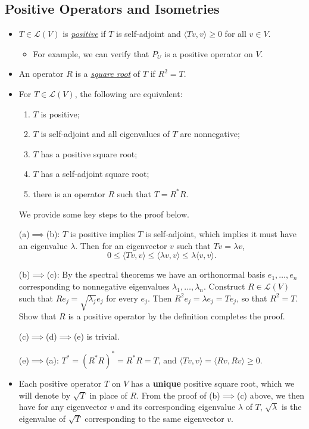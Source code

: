 \documentclass{article}
\newcommand{\df}[1]{\ul{\textit{#1}}}
\newcommand{\inp}[2]{\langle #1, #2 \rangle}
\newcommand{\LV}{\mathcal{L}(V)}
\begin{document}
\subsection{Positive Operators and Isometries}
\begin{itemize}
    \item $T \in \LV$ is \df{positive} if $T$ is self-adjoint and $\inp{Tv}{v} \geq 0$ for all $v \in V$.
    \begin{itemize}
        \item For example, we can verify that $P_U$ is a positive operator on $V$.
    \end{itemize}
    \item An operator $R$ is a \df{square root} of $T$ if $R^2 = T$.
    \item For $T \in \LV$, the following are equivalent:
    \begin{enumerate}[label=(\alph*)]
        \item $T$ is positive;
        \item $T$ is self-adjoint and all eigenvalues of $T$ are nonnegative;
        \item $T$ has a positive square root;
        \item $T$ has a self-adjoint square root;
        \item there is an operator $R$ such that $T = R^* R$.
    \end{enumerate}
    We provide some key steps to the proof below.
    
    (a)$\implies$(b): $T$ is positive implies $T$ is self-adjoint, which implies it must have an eigenvalue $\lambda$. Then for an eigenvector $v$ such that $Tv = \lambda v$, $$0 \leq \inp{Tv}{v} \leq \inp{\lambda v}{v} \leq \lambda\inp{v}{v}.$$
    
    (b)$\implies$(c): By the spectral theorems we have an orthonormal basis $e_1,\dots,e_n$ corresponding to nonnegative eigenvalues $\lambda_1,\dots,\lambda_n$. Construct $R \in \LV$ such that $Re_j = \sqrt{\lambda_j} e_j$ for every $e_j$. Then $R^2e_j = \lambda e_j = Te_j$, so that $R^2 = T$. Show that $R$ is a positive operator by the definition completes the proof.
    
    (c)$\implies$(d)$\implies$(e) is trivial.
    
    (e)$\implies$(a): $T^* = (R^*R)^* = R^*R = T$, and $\inp{Tv}{v}=\inp{Rv}{Rv} \geq 0$.
    
    \item Each positive operator $T$ on $V$ has a \textbf{unique} positive square root, which we will denote by $\sqrt{T}$ in place of $R$. From the proof of (b)$\implies$(c) above, we then have for any eigenvector $v$ and its corresponding eigenvalue $\lambda$ of $T$, $\sqrt{\lambda}$ is the eigenvalue of $\sqrt{T}$ corresponding to the same eigenvector $v$.
    

\end{itemize}
\end{document}
